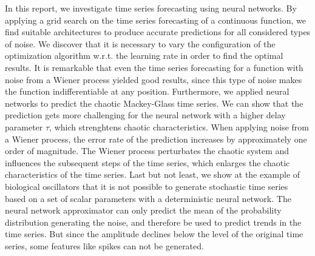 \documentclass{article}
\begin{document}
In this report, we investigate time series forecasting using neural networks.
By applying a grid search on the time series forecasting of a continuous 
function, we find suitable architectures to produce accurate predictions for 
all considered types of noise. We discover that it is necessary to vary the 
configuration of the optimization algorithm w.r.t. the learning rate in order 
to find the optimal results. It is remarkable that even the time series 
forecasting for a function with noise from a Wiener process yielded good 
results, since this type of noise makes the function indifferentiable at any 
position. Furthermore, we applied neural networks to predict the chaotic 
Mackey-Glass time series. We can show that the prediction gets more challenging
for the neural network with a higher delay parameter $\tau$, which strenghtens
chaotic characteristics. When applying noise from a Wiener process, the error
rate of the prediction increases by approximately one order of magnitude. The
Wiener process perturbates the chaotic system and influences the subsequent
steps of the time series, which enlarges the chaotic characteristics of the 
time series. Last but not least, we show at the example of biological
oscillators that it is not possible to generate stochastic time series based on
a set of scalar parameters with a deterministic neural network. The neural
network approximator can only predict the mean of the probability distribution
generating the noise, and therefore be used to predict trends in the time 
series. But since the amplitude declines below the level of the original time 
series, some features like spikes can not be generated.



\end{document}
